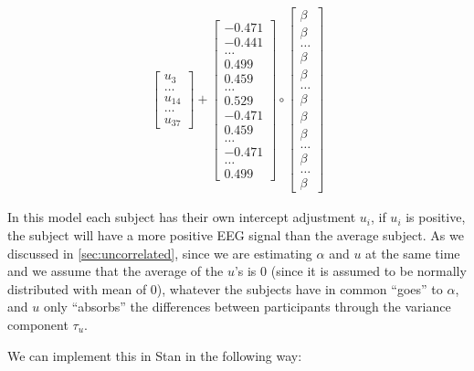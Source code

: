 \documentclass[12pt,]{krantz}
\theoremstyle{definition}
\theoremstyle{definition}
\theoremstyle{definition}
\theoremstyle{remark}
\begin{document}
\begin{equation}
\begin{aligned}
\begin{bmatrix}
u_{3} \\
\ldots \\
u_{14} \\
\ldots \\
u_{37 }
\end{bmatrix}
+
\begin{bmatrix}
{-0.471} \\
{-0.441} \\
\ldots \\
{0.499} \\
{0.459} \\
\ldots \\
{0.529} \\
{-0.471} \\
{0.459} \\
\ldots \\
{-0.471} \\
\ldots \\
{0.499 }
\end{bmatrix}
\circ
\begin{bmatrix}
\beta \\
\beta \\
\ldots \\
\beta \\
\beta \\
\ldots \\
\beta \\
\beta \\
\beta \\
\ldots \\
\beta \\
\ldots \\
\beta
\end{bmatrix}
\end{aligned}
\end{equation}

In this model each subject has their own intercept adjustment \(u_i\),
if \(u_i\) is positive, the subject will have a more positive EEG signal
than the average subject. As we discussed in \ref{sec:uncorrelated},
since we are estimating \(\alpha\) and \(u\) at the same time and we
assume that the average of the \(u\)'s is 0 (since it is assumed to be
normally distributed with mean of 0), whatever the subjects have in
common ``goes'' to \(\alpha\), and \(u\) only ``absorbs'' the
differences between participants through the variance component
\(\tau_u\).

We can implement this in Stan in the following way:
\end{document}
